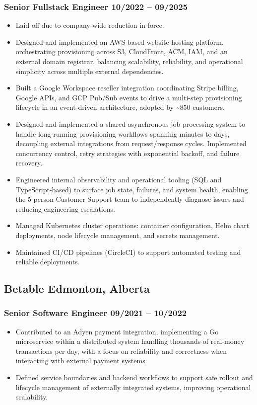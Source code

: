 \documentclass[10pt]{article}
\begin{document}
\subsubsection{Senior Fullstack Engineer \hfill 10/2022 -- 09/2025}
\begin{itemize}
  \item Laid off due to company-wide reduction in force.
  \item Designed and implemented an AWS-based website hosting platform, orchestrating provisioning across S3, CloudFront, ACM, IAM, and an external domain registrar, balancing scalability, reliability, and operational simplicity across multiple external dependencies.
  \item Built a Google Workspace reseller integration coordinating Stripe billing, Google APIs, and GCP Pub/Sub events to drive a multi-step provisioning lifecycle in an event-driven architecture, adopted by \textasciitilde850 customers.
  \item Designed and implemented a shared asynchronous job processing system to handle long-running provisioning workflows spanning minutes to days, decoupling external integrations from request/response cycles. Implemented concurrency control, retry strategies with exponential backoff, and failure recovery.
  \item Engineered internal observability and operational tooling (SQL and TypeScript-based) to surface job state, failures, and system health, enabling the 5-person Customer Support team to independently diagnose issues and reducing engineering escalations.
  \item Managed Kubernetes cluster operations: container configuration, Helm chart deployments, node lifecycle management, and secrets management.
  \item Maintained CI/CD pipelines (CircleCI) to support automated testing and reliable deployments.
\end{itemize}

\subsection{Betable \hfill Edmonton, Alberta}
\subsubsection{Senior Software Engineer \hfill 09/2021 -- 10/2022}
\begin{itemize}
  \item Contributed to an Adyen payment integration, implementing a Go microservice within a distributed system handling thousands of real-money transactions per day, with a focus on reliability and correctness when interacting with external payment systems.
  \item Defined service boundaries and backend workflows to support safe rollout and lifecycle management of externally integrated systems, improving operational scalability.
\end{itemize}
\end{document}
